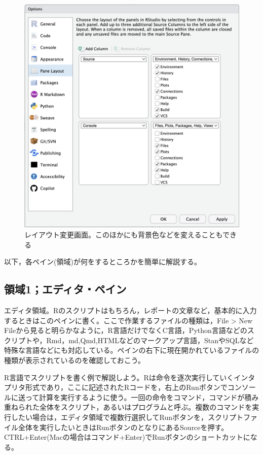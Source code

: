 \documentclass[
  a4paper,
]{ltjsbook}
\begin{document}
\begin{figure}[H]

{\centering \includegraphics{../common/images/01_PaneLayout.png}

}

\caption{レイアウト変更画面。このほかにも背景色などを変えることもできる}

\end{figure}%

以下，各ペイン(領域)が何をするところかを簡単に解説する。

\subsection{領域1；エディタ・ペイン}\label{ux9818ux57df1ux30a8ux30c7ux30a3ux30bfux30daux30a4ux30f3}

エディタ領域。Rのスクリプトはもちろん，レポートの文章など，基本的に入力するときはこのペインに書く。ここで作業するファイルの種類は，File
\textgreater{} New
Fileから見ると明らかなように，R言語だけでなくC言語，Python言語などのスクリプトや，Rmd，md,Qmd,HTMLなどのマークアップ言語，StanやSQLなど特殊な言語などにも対応している。ペインの右下に現在開かれているファイルの種類が表示されているのを確認しておこう。

R言語でスクリプトを書く例で解説しよう。Rは命令を逐次実行していくインタプリタ形式であり，ここに記述されたRコードを，右上のRunボタンでコンソールに送って計算を実行するように使う。一回の命令をコマンド，コマンドが積み重ねられた全体をスクリプト，あるいはプログラムと呼ぶ。複数のコマンドを実行したい場合は，エディタ領域で複数行選択してRunボタンを，スクリプトファイル全体を実行したいときはRunボタンのとなりにあるSourceを押す。CTRL+Enter(Macの場合はコマンド+Enter)でRunボタンのショートカットになる。
\end{document}
